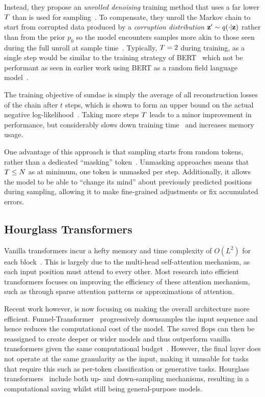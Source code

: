 Instead, they propose an \textit{unrolled denoising} training method that uses a
far lower $T$ than is used for
sampling~\cite{savinov2022stepunrolled}. To compensate, they unroll the Markov
chain to start from corrupted data produced by a \textit{corruption
distribution} $\mathbf{z}' \sim q(\cdot \vert \mathbf{z})$
rather than from the prior $p_0$ so the model encounters samples more akin to
those seen during the full unroll at sample time~\cite{savinov2022stepunrolled}.
Typically, $T = 2$ during training, as a single step would be similar
to the training strategy of BERT~\cite{devlin2019bert} which not be performant
as seen in earlier work using BERT as a random field language
model~\cite{wang2019bert}.

The training objective of \gls{sundae} is simply the average of all reconstruction
losses of the chain after $t$ steps, which is shown to form
an upper bound on the actual negative
log-likelihood~\cite{savinov2022stepunrolled}. Taking more steps $T$
leads to a minor improvement in performance, but considerably slows down
training time~\cite{savinov2022stepunrolled} and increases memory usage.

One advantage of this approach is that sampling starts from random tokens,
rather than a dedicated ``masking''
token~\cite{bondtaylor2021unleashing,austin2021structured}. Unmasking approaches
means that $T \leq N$ as at minimum, one token is unmasked per step.
Additionally, it allows the model to be able to ``change its mind'' about
previously predicted positions during sampling, allowing it to make fine-grained
adjustments or fix accumulated errors.

\subsection{Hourglass Transformers}
\label{subsec:hourglass}

Vanilla transformers incur a hefty memory and time complexity of $O(L^2)$ for
each block~\cite{vaswani2017attention}. This is largely due to the multi-head
self-attention mechanism, as each input position must attend to every other.
Most research into efficient transformers focuses on improving the efficiency of
these attention mechanism, such as through sparse attention patterns or
approximations of attention.

Recent work however, is now focusing on making the overall architecture more
efficient. Funnel-Transformer~\cite{dai2020funneltransformer} progressively
downsamples the input sequence and hence reduces the computational cost of the
model. The saved \glspl{flop} can then be reassigned to create deeper or wider models
and thus outperform vanilla transformers given the same computational
budget~\cite{dai2020funneltransformer}. However, the final layer does not
operate at the same granularity as the input, making it unusable for tasks that
require this such as per-token classification or generative tasks. Hourglass
transformers~\cite{nawrot2021hierarchical} include both up- and down-sampling
mechanisms, resulting in a computational saving whilst still being
general-purpose models.

